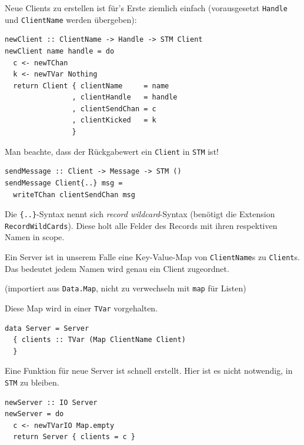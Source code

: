 \documentclass{beamer}
\begin{document}
\begin{frame}[fragile]

Neue Clients zu erstellen ist für's Erste ziemlich einfach (vorausgesetzt \texttt{Handle} und 
\texttt{ClientName} werden übergeben):\smallskip

\begin{verbatim}
newClient :: ClientName -> Handle -> STM Client
newClient name handle = do
  c <- newTChan
  k <- newTVar Nothing
  return Client { clientName     = name
                , clientHandle   = handle
                , clientSendChan = c
                , clientKicked   = k
                }
\end{verbatim}
\pause
Man beachte, dass der Rückgabewert ein \texttt{Client} in \texttt{STM} ist!
\pause
      
\begin{verbatim}          
sendMessage :: Client -> Message -> STM ()
sendMessage Client{..} msg =
  writeTChan clientSendChan msg
\end{verbatim}

Die \texttt{\{..\}}-Syntax nennt sich \emph{record wildcard}-Syntax (benötigt die Extension \texttt{RecordWildCards}). Diese holt alle Felder des Records mit ihren respektiven Namen in scope.

\end{frame}


\begin{frame}[fragile]

Ein Server ist in unserem Falle eine Key-Value-Map von \texttt{ClientName}s zu \texttt{Client}s. Das bedeutet jedem Namen wird genau ein Client zugeordnet.

(importiert aus \texttt{Data.Map}, nicht zu verwechseln mit \texttt{map} für Listen)\smallskip

Diese Map wird in einer \texttt{TVar} vorgehalten.\bigskip

\begin{verbatim}
data Server = Server
  { clients :: TVar (Map ClientName Client)
  }
\end{verbatim}

\end{frame}
  
  

\begin{frame}[fragile] 

Eine Funktion für neue Server ist schnell erstellt. Hier ist es nicht notwendig, in 
\texttt{STM} zu bleiben.

\begin{verbatim}
newServer :: IO Server
newServer = do
  c <- newTVarIO Map.empty
  return Server { clients = c }
\end{verbatim}
\end{frame}
\end{document}

